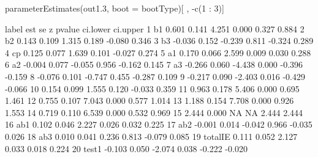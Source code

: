 \begin{Schunk}
\begin{Sinput}
 parameterEstimates(out1.3, boot = bootType)[ , -c(1 : 3)]
\end{Sinput}
\begin{Soutput}
     label    est    se      z pvalue ci.lower ci.upper
1       b1  0.601 0.141  4.251  0.000    0.327    0.884
2       b2  0.143 0.109  1.315  0.189   -0.080    0.346
3       b3 -0.036 0.152 -0.239  0.811   -0.324    0.289
4       cp  0.125 0.077  1.639  0.101   -0.027    0.274
5       a1  0.170 0.066  2.599  0.009    0.030    0.288
6       a2 -0.004 0.077 -0.055  0.956   -0.162    0.145
7       a3 -0.266 0.060 -4.438  0.000   -0.396   -0.159
8          -0.076 0.101 -0.747  0.455   -0.287    0.109
9          -0.217 0.090 -2.403  0.016   -0.429   -0.066
10          0.154 0.099  1.555  0.120   -0.033    0.359
11          0.963 0.178  5.406  0.000    0.695    1.461
12          0.755 0.107  7.043  0.000    0.577    1.014
13          1.188 0.154  7.708  0.000    0.926    1.553
14          0.719 0.110  6.539  0.000    0.532    0.969
15          2.444 0.000     NA     NA    2.444    2.444
16     ab1  0.102 0.046  2.227  0.026    0.032    0.225
17     ab2 -0.001 0.014 -0.042  0.966   -0.035    0.026
18     ab3  0.010 0.041  0.236  0.813   -0.079    0.085
19 totalIE  0.111 0.052  2.127  0.033    0.018    0.224
20   test1 -0.103 0.050 -2.074  0.038   -0.222   -0.020
\end{Soutput}
\end{Schunk}
